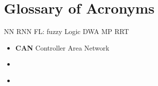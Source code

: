 \chapter*{Glossary of Acronyms}

NN
RNN
FL: fuzzy Logic
DWA
MP
RRT

\begin{itemize}
    \item \textbf{CAN} Controller Area Network
    \item \textbf{} 

    \newpage
    \thispagestyle{acronyms}
    \item \textbf{} 

\end{itemize}

\newpage







